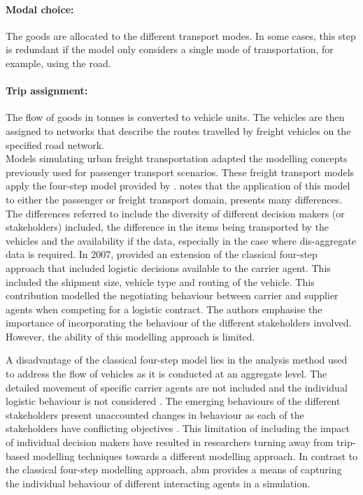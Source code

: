 \paragraph{Modal choice:} The goods are allocated to the different transport modes. In some cases, this step is redundant if the model only considers a single mode of transportation, for example, using the road.

\paragraph{Trip assignment:} The flow of goods in tonnes is converted to vehicle units. The vehicles are then assigned to networks that describe the routes travelled by freight vehicles on the specified road network.\\

Models simulating urban freight transportation adapted the modelling concepts previously used for passenger transport scenarios. These freight transport models apply the four-step model provided by \citet{de2004national}. \citet{deJong2014new} notes that the application of this model to either the passenger or freight transport domain, presents many differences. The differences referred to include the diversity of different decision makers (or stakeholders) included, the difference in the items being transported by the vehicles and the availability if the data, especially in the case where dis-aggregate data is required. In 2007, \citet{wisetjindawat2007micro} provided an extension of the classical four-step approach that included logistic decisions available to the carrier agent. This included the shipment size, vehicle type and routing of the vehicle. This contribution modelled the negotiating behaviour between carrier and supplier agents when competing for a logistic contract. The authors emphasise the importance of incorporating the behaviour of the different stakeholders involved. However, the ability of this modelling approach is limited.\par

A disadvantage of the classical four-step model lies in the analysis method used to address the flow of vehicles as it is conducted at an aggregate level. The detailed movement of specific carrier agents are not included \citep{joubert2010large} and the individual logistic behaviour is not considered \citep{bean2020behavioural}.
The emerging behaviours of the different stakeholders present unaccounted changes in behaviour as each of the stakeholders have conflicting objectives \citep{macharis2014stakeholder}. This limitation of including the impact of individual decision makers have resulted in researchers turning away from trip-based modelling techniques towards a different modelling approach.  In contrast to the classical four-step modelling approach, \acrshort{abm} provides a means of capturing the individual behaviour of different interacting agents in a simulation.


